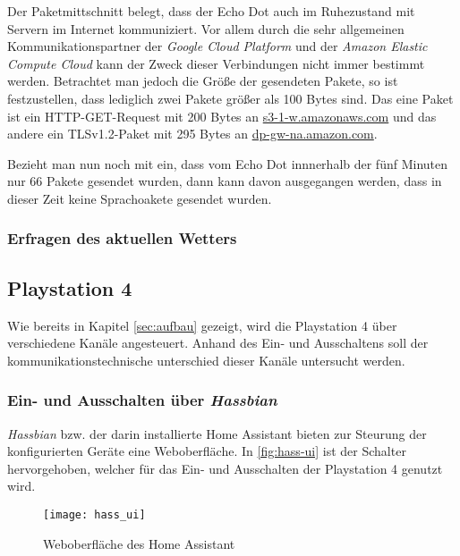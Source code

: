 Der Paketmittschnitt belegt, dass der Echo Dot auch im Ruhezustand mit Servern im Internet kommuniziert.
Vor allem durch die sehr allgemeinen Kommunikationspartner der \textit{Google Cloud Platform} und der \textit{Amazon Elastic Compute Cloud}
kann der Zweck dieser Verbindungen nicht immer bestimmt werden.
Betrachtet man jedoch die Größe der gesendeten Pakete, so ist festzustellen,
dass lediglich zwei Pakete größer als 100 Bytes sind.
Das eine Paket ist ein HTTP-GET-Request mit 200 Bytes an \url{s3-1-w.amazonaws.com} und
das andere ein TLSv1.2-Paket mit 295 Bytes an \url{dp-gw-na.amazon.com}.

Bezieht man nun noch mit ein, dass vom Echo Dot innnerhalb der fünf Minuten nur 66 Pakete gesendet wurden,
dann kann davon ausgegangen werden, dass in dieser Zeit keine Sprachoakete gesendet wurden.




\subsubsection{Erfragen des aktuellen Wetters}


\subsection{Playstation 4}
Wie bereits in Kapitel \ref{sec:aufbau} \textit{} gezeigt, wird die Playstation 4 über verschiedene Kanäle angesteuert.
Anhand des Ein- und Ausschaltens soll der kommunikationstechnische unterschied dieser Kanäle untersucht werden.

\subsubsection{Ein- und Ausschalten über \textit{Hassbian}}
\textit{Hassbian} bzw. der darin installierte Home Assistant bieten zur Steurung der konfigurierten Geräte eine Weboberfläche.
In \autoref{fig:hass-ui} ist der Schalter hervorgehoben, welcher für das Ein- und Ausschalten der Playstation 4 genutzt wird.

\begin{figure}[h!]
    \centering
    \texttt{[image: hass\_ui]}
    \caption{Weboberfläche des Home Assistant}\label{fig:hass-ui}
\end{figure}

